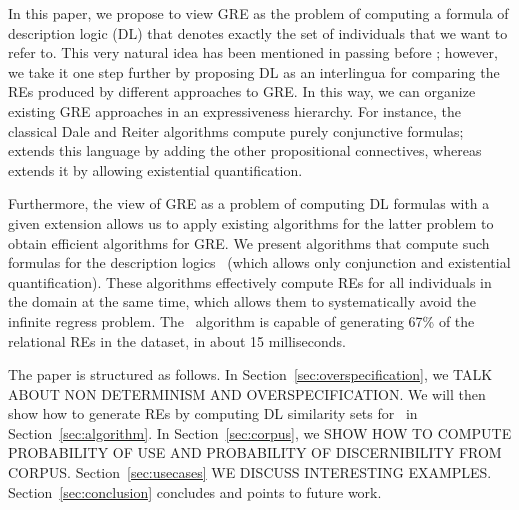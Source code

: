 In this paper, we propose to view GRE as the problem of computing a
formula of description logic (DL) that denotes exactly the set of
individuals that we want to refer to.  This very natural idea has been
mentioned in passing before
\cite{Krahmer2003,gardent07:_gener_bridg_defin_descr}; however, we
take it one step further by proposing DL as an interlingua for
comparing the REs produced by different approaches to GRE.  In this
way, we can organize existing GRE approaches in an expressiveness
hierarchy.  For instance, the classical Dale and Reiter algorithms
compute purely conjunctive formulas;
\cite{deemter02:_gener_refer_expres} extends this language by
adding the other propositional connectives, whereas
\cite{dale91:_gener_refer_expres_invol_relat} extends it by
allowing existential quantification.

Furthermore, the view of GRE as a problem of computing DL formulas
with a given extension allows us to apply existing algorithms for the
latter problem to obtain efficient algorithms for GRE.  We present
algorithms that compute such formulas for the description logics \el\
(which allows only conjunction and existential quantification).  These algorithms effectively
compute REs for all individuals in the domain at the same time, which
allows them to systematically avoid the infinite regress problem.  The
\el\ algorithm is capable of generating 67\% of the relational REs in
the \cite{viethen06:_algor_for_gener_refer_expres} dataset, in about
15 milliseconds.  


The paper is structured as follows.  In Section~\ref{sec:overspecification}, we
TALK ABOUT NON DETERMINISM AND OVERSPECIFICATION.  We will then show how to
generate REs by computing DL similarity sets for  \el\ in
Section~\ref{sec:algorithm}.  In Section~\ref{sec:corpus}, we SHOW HOW TO COMPUTE
PROBABILITY OF USE AND PROBABILITY OF DISCERNIBILITY FROM CORPUS.  Section~\ref{sec:usecases}
WE DISCUSS INTERESTING EXAMPLES. Section~\ref{sec:conclusion} concludes and points to future work.

